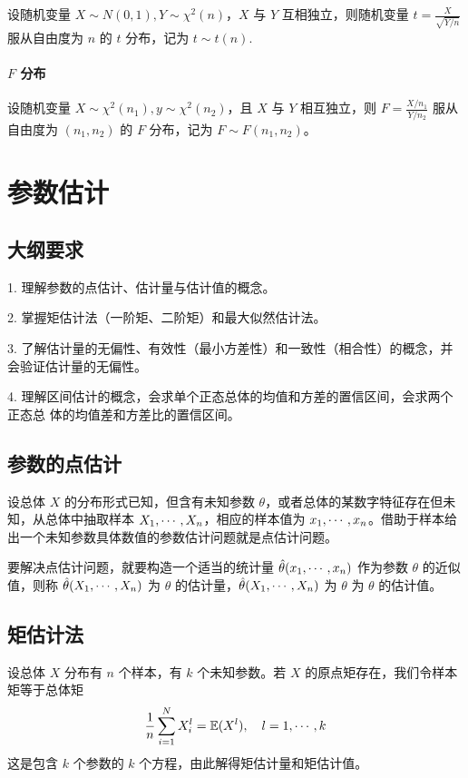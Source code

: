 设随机变量 $X \sim N(0, 1), Y \sim \chi^2(n)$，$X$ 与 $Y$ 互相独立，则随机变量 $t = \frac{X}{\sqrt{Y / n}}$ 服从自由度为 $n$ 的 $t$ 分布，记为 $t \sim t(n)$.

\paragraph{$F$ 分布}

设随机变量 $X \sim \chi^2(n_1), y \sim \chi^2(n_2)$，且 $X$ 与 $Y$ 相互独立，则 $F = \frac{X / n_1}{Y / n_2}$ 服从自由度为 $(n_1, n_2)$ 的 $F$ 分布，记为 $F \sim F(n_1, n_2)$。


\section{参数估计}

\subsection{大纲要求}

1. 理解参数的点估计、估计量与估计值的概念。

2. 掌握矩估计法（一阶矩、二阶矩）和最大似然估计法。

3. 了解估计量的无偏性、有效性（最小方差性）和一致性（相合性）的概念，并会验证估计量的无偏性。

4. 理解区间估计的概念，会求单个正态总体的均值和方差的置信区间，会求两个正态总
体的均值差和方差比的置信区间。

\subsection{参数的点估计}

设总体 $X$ 的分布形式已知，但含有未知参数 $\theta$，或者总体的某数字特征存在但未知，从总体中抽取样本 $X_1,\cdots,X_n$，相应的样本值为 $x_1,\cdots,x_n$。借助于样本给出一个未知参数具体数值的参数估计问题就是点估计问题。

要解决点估计问题，就要构造一个适当的统计量 $\hat{\theta}(x_1,\cdots,x_n)$ 作为参数 $\theta$ 的近似值，则称 $\hat{\theta}(X_1,\cdots,X_n)$ 为 $\theta$ 的估计量，$\hat{\theta}(X_1,\cdots,X_n)$ 为 $\theta$ 为 $\theta$ 的估计值。

\subsection{矩估计法}

设总体 $X$ 分布有 $n$ 个样本，有 $k$ 个未知参数。若 $X$ 的原点矩存在，我们令样本矩等于总体矩
\[ \frac{1}{n} \sum_{i=1}^{N} X_i^l = \mathbb{E}(X^l), \quad l = 1, \cdots, k \]
这是包含 $k$ 个参数的 $k$ 个方程，由此解得矩估计量和矩估计值。

